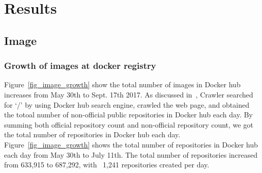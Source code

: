 \section{Results}
\label{sec:results}


\subsection{Image}

\subsubsection{Growth  of images at docker registry}

Figure~\ref{fig_image_growth} show the total number of images in Docker hub increases from May 30th to Sept. 17th 2017. As discussed in~\cite{XXX}, Crawler searched for `/' by using Docker hub search engine, crawled the web page, and obtained the totoal number of non-official public repositories in Docker hub each day. By summing both official repository count and non-official repository count, we got the total number of repositories in Docker hub each day. Figure~\ref{fig_image_growth} shows the total number of repositories in Docker hub each day from May 30th to July 11th. The total number of repositories increased from 633,915 to 687,292, with ~1,241 repositories created per day.

